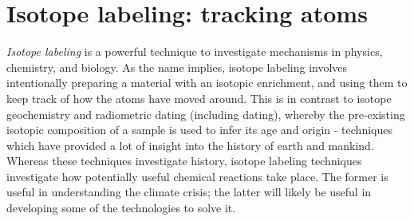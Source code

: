 \section{Isotope labeling: tracking atoms}


\textit{Isotope labeling} is a powerful technique to investigate mechanisms in physics, chemistry, and biology. As the name implies, isotope labeling involves intentionally preparing a material with an isotopic enrichment, and using them to keep track of how the atoms have moved around. This is in contrast to isotope geochemistry\cite{Harnung2012} and radiometric dating (including  dating)\cite{Taylor2014, Allegre2008}, whereby the pre-existing isotopic composition of a sample is used to infer its age and origin - techniques which have provided a lot of insight into the history of earth and mankind. Whereas these techniques investigate history, isotope labeling techniques investigate how potentially useful chemical reactions take place. The former is useful in understanding the climate crisis; the latter will likely be useful in developing some of the technologies to solve it.

